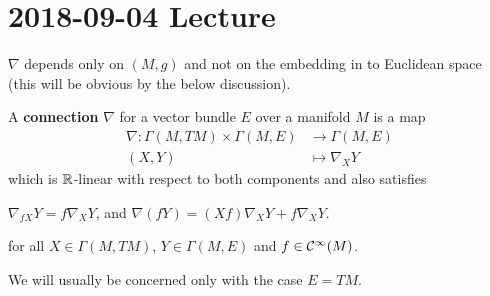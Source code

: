 \section{2018-09-04 Lecture}

\begin{rmk}
  $\nabla$ depends only on $(M,g)$ and not on the embedding in to Euclidean space (this will be obvious by the below discussion).
\end{rmk}

\begin{defn}
  A \textbf{connection} $\nabla$ for a vector bundle $E$ over a manifold $M$ is a map
  \begin{align*}
    \nabla: \Gamma(M,TM) \times \Gamma(M,E) &\to \Gamma(M,E) \\
    (X,Y) &\mapsto \nabla_XY
  \end{align*}
  which is $\mathbb{R}$-linear with respect to both components and also satisfies
  \begin{enum}
    \io $\nabla_{fX}Y=f\nabla_XY$, and
    \io $\nabla(fY)=(Xf)\nabla_XY+f\nabla_XY$.
  \end{enum}
  for all $X\in\Gamma(M,TM)$, $Y\in\Gamma(M,E)$ and $f\in\mathcal{C}^\infty(M)$.
\end{defn}

We will usually be concerned only with the case $E=TM$.

